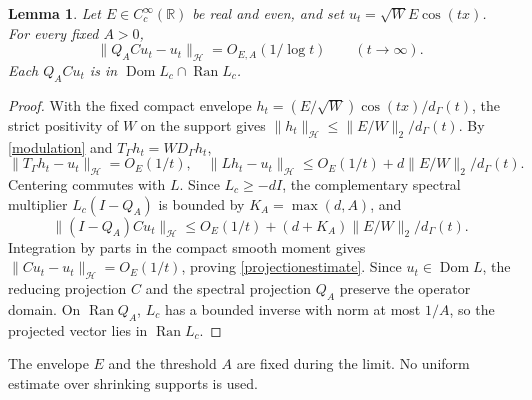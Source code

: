 \documentclass[11pt]{article}
\newtheorem{lemma}[theorem]{Lemma}
\newcommand{\R}{\mathbb R}\newcommand{\Hh}{\mathcal H}\newcommand{\Nn}{\mathcal N}\newcommand{\Kk}{\mathcal K}\newcommand{\norm}[1]{\lVert#1\rVert}\newcommand{\ip}[2]{\langle #1,#2\rangle}\newcommand{\dom}{\operatorname{Dom}}
\begin{document}
\begin{lemma}\label{fixedprojection}
Let $E\in C_c^\infty(\R)$ be real and even, and set $u_t=\sqrt W E\cos(tx)$. For every fixed $A>0$,
\begin{equation}\label{projectionestimate}
 \norm{Q_A C u_t-u_t}_{\Hh}=O_{E,A}(1/\log t)\qquad(t\to\infty).
\end{equation}
Each $Q_A C u_t$ is in $\dom L_c\cap\operatorname{Ran}L_c$.
\end{lemma}
\begin{proof}
With the fixed compact envelope $h_t=(E/\sqrt W)\cos(tx)/d_\Gamma(t)$, the strict positivity of $W$ on the support gives $\norm{h_t}_{\Hh}\le\norm{E/W}_2/d_\Gamma(t)$. By \eqref{modulation} and $T_\Gamma h_t=W D_\Gamma h_t$,
\[\norm{T_\Gamma h_t-u_t}_{\Hh}=O_E(1/t),\quad
 \norm{Lh_t-u_t}_{\Hh}\le O_E(1/t)+d\norm{E/W}_2/d_\Gamma(t).
\]
Centering commutes with $L$. Since $L_c\ge-dI$, the complementary spectral multiplier $L_c(I-Q_A)$ is bounded by $K_A=\max(d,A)$, and
\[\norm{(I-Q_A)Cu_t}_{\Hh}\le O_E(1/t)+(d+K_A)\norm{E/W}_2/d_\Gamma(t).
\]
Integration by parts in the compact smooth moment gives $\norm{Cu_t-u_t}_{\Hh}=O_E(1/t)$, proving \eqref{projectionestimate}. Since $u_t\in\dom L$, the reducing projection $C$ and the spectral projection $Q_A$ preserve the operator domain. On $\operatorname{Ran}Q_A$, $L_c$ has a bounded inverse with norm at most $1/A$, so the projected vector lies in $\operatorname{Ran}L_c$.
\end{proof}
The envelope $E$ and the threshold $A$ are fixed during the limit. No uniform estimate over shrinking supports is used.
\end{document}
